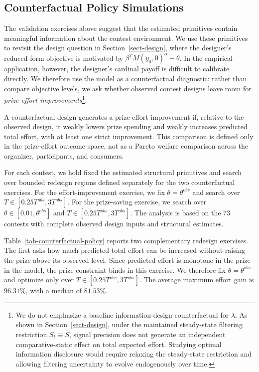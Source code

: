 \documentclass[mnsc]{informs3}
\begin{document}
\subsection{Counterfactual Policy Simulations}

The validation exercises above suggest that the estimated primitives contain
meaningful information about the contest environment. We use these primitives to
revisit the design question in Section~\ref{sect-design}, where the designer's
reduced-form objective is motivated by $\beta^{T}M(\tilde{y}_0,0)^\alpha-\theta$. In the
empirical application, however, the designer's cardinal payoff is difficult to
calibrate directly. We therefore use the model as a counterfactual diagnostic:
rather than compare objective levels, we ask whether observed contest designs
leave room for \textit{prize-effort improvements}\footnote{
We do not emphasize a baseline information-design counterfactual for
$\lambda$. As shown in Section~\ref{sect-design}, under the maintained
steady-state filtering restriction $S_t\equiv\bar S$, signal precision does not
generate an independent comparative-static effect on total expected effort.
Studying optimal information disclosure would require relaxing the steady-state
restriction and allowing filtering uncertainty to evolve endogenously over time.
}.

A counterfactual design generates a prize-effort improvement if, relative to the observed design, it weakly lowers prize spending and weakly increases predicted total effort, with at least one strict improvement.
This comparison is defined only in the prize-effort outcome space, not as a Pareto welfare comparison across the organizer, participants, and consumers.

For each contest, we hold fixed the estimated structural primitives and search
over bounded redesign regions defined separately for the two counterfactual exercises.
For the effort-improvement exercise, we fix
$\theta=\theta^{obs}$ and search over $T\in[0.25T^{obs},3T^{obs}]$.
For the prize-saving exercise, we search over
$\theta\in[0.01,\theta^{obs}]$ and $T\in[0.25T^{obs},3T^{obs}]$.
The analysis is based on the 73 contests with complete observed design inputs
and structural estimates.

Table~\ref{tab-counterfactual-policy} reports two complementary redesign
exercises. The first asks how much predicted total effort can be increased
without raising the prize above its observed level. Since predicted effort is
monotone in the prize in the model, the prize constraint binds in this exercise.
We therefore fix $\theta=\theta^{obs}$ and optimize only over
$T\in[0.25T^{obs},3T^{obs}]$. The average maximum effort gain is $96.31\%$,
with a median of $81.53\%$.
\end{document}
